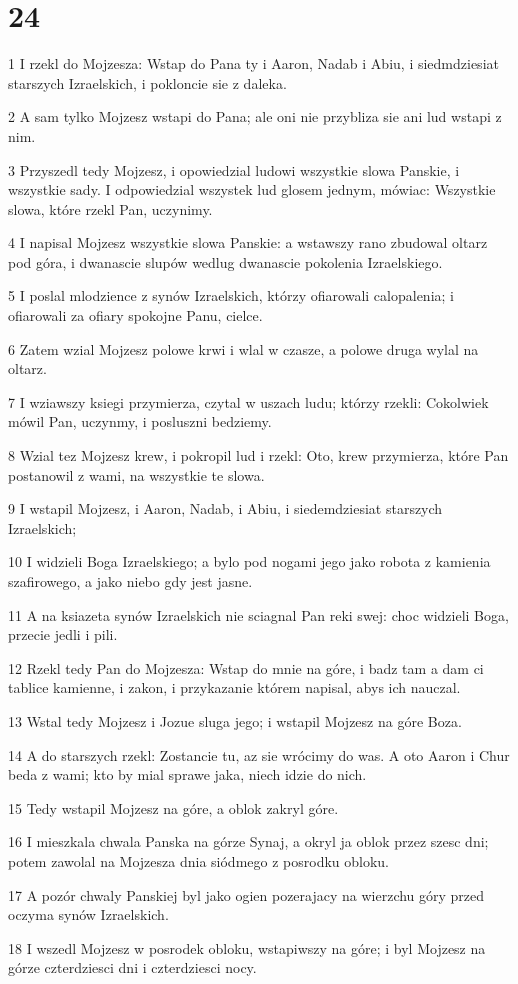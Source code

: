 \chapter{24}

\par 1 I rzekl do Mojzesza: Wstap do Pana ty i Aaron, Nadab i Abiu, i siedmdziesiat starszych Izraelskich, i pokloncie sie z daleka.
\par 2 A sam tylko Mojzesz wstapi do Pana; ale oni nie przybliza sie ani lud wstapi z nim.
\par 3 Przyszedl tedy Mojzesz, i opowiedzial ludowi wszystkie slowa Panskie, i wszystkie sady. I odpowiedzial wszystek lud glosem jednym, mówiac: Wszystkie slowa, które rzekl Pan, uczynimy.
\par 4 I napisal Mojzesz wszystkie slowa Panskie: a wstawszy rano zbudowal oltarz pod góra, i dwanascie slupów wedlug dwanascie pokolenia Izraelskiego.
\par 5 I poslal mlodzience z synów Izraelskich, którzy ofiarowali calopalenia; i ofiarowali za ofiary spokojne Panu, cielce.
\par 6 Zatem wzial Mojzesz polowe krwi i wlal w czasze, a polowe druga wylal na oltarz.
\par 7 I wziawszy ksiegi przymierza, czytal w uszach ludu; którzy rzekli: Cokolwiek mówil Pan, uczynmy, i posluszni bedziemy.
\par 8 Wzial tez Mojzesz krew, i pokropil lud i rzekl: Oto, krew przymierza, które Pan postanowil z wami, na wszystkie te slowa.
\par 9 I wstapil Mojzesz, i Aaron, Nadab, i Abiu, i siedemdziesiat starszych Izraelskich;
\par 10 I widzieli Boga Izraelskiego; a bylo pod nogami jego jako robota z kamienia szafirowego, a jako niebo gdy jest jasne.
\par 11 A na ksiazeta synów Izraelskich nie sciagnal Pan reki swej: choc widzieli Boga, przecie jedli i pili.
\par 12 Rzekl tedy Pan do Mojzesza: Wstap do mnie na góre, i badz tam a dam ci tablice kamienne, i zakon, i przykazanie którem napisal, abys ich nauczal.
\par 13 Wstal tedy Mojzesz i Jozue sluga jego; i wstapil Mojzesz na góre Boza.
\par 14 A do starszych rzekl: Zostancie tu, az sie wrócimy do was. A oto Aaron i Chur beda z wami; kto by mial sprawe jaka, niech idzie do nich.
\par 15 Tedy wstapil Mojzesz na góre, a oblok zakryl góre.
\par 16 I mieszkala chwala Panska na górze Synaj, a okryl ja oblok przez szesc dni; potem zawolal na Mojzesza dnia siódmego z posrodku obloku.
\par 17 A pozór chwaly Panskiej byl jako ogien pozerajacy na wierzchu góry przed oczyma synów Izraelskich.
\par 18 I wszedl Mojzesz w posrodek obloku, wstapiwszy na góre; i byl Mojzesz na górze czterdziesci dni i czterdziesci nocy.

